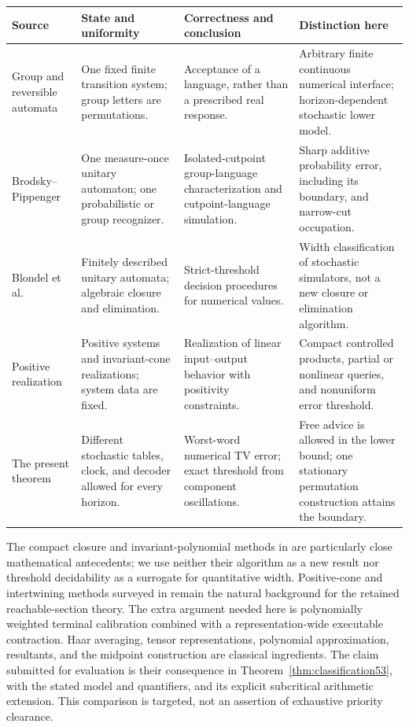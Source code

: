 \documentclass[11pt]{amsart}
\numberwithin{equation}{section}
\theoremstyle{definition}
\theoremstyle{remark}
\begin{document}
\begin{center}\footnotesize
\setlength{\tabcolsep}{3pt}
\begin{tabular}{p{}p{}p{}p{}}
\toprule
Source & State and uniformity & Correctness and conclusion & Distinction here\\
\midrule
Group and reversible automata \cite{BP,Paz} & One fixed finite transition system; group letters are permutations. & Acceptance of a language, rather than a prescribed real response. & Arbitrary finite continuous numerical interface; horizon-dependent stochastic lower model.\\[4pt]
Brodsky--Pippenger \cite{BP} & One measure-once unitary automaton; one probabilistic or group recognizer. & Isolated-cutpoint group-language characterization and cutpoint-language simulation. & Sharp additive probability error, including its boundary, and narrow-cut occupation.\\[4pt]
Blondel et al.\ \cite{BJKP} & Finitely described unitary automata; algebraic closure and elimination. & Strict-threshold decision procedures for numerical values. & Width classification of stochastic simulators, not a new closure or elimination algorithm.\\[4pt]
Positive realization \cite{BF04} & Positive systems and invariant-cone realizations; system data are fixed. & Realization of linear input--output behavior with positivity constraints. & Compact controlled products, partial or nonlinear queries, and nonuniform error threshold.\\[4pt]
The present theorem & Different stochastic tables, clock, and decoder allowed for every horizon. & Worst-word numerical TV error; exact threshold from component oscillations. & Free advice is allowed in the lower bound; one stationary permutation construction attains the boundary.\\
\bottomrule
\end{tabular}
\end{center}

The compact closure and invariant-polynomial methods in \cite{BJKP} are particularly close mathematical antecedents; we use neither their algorithm as a new result nor threshold decidability as a surrogate for quantitative width. Positive-cone and intertwining methods surveyed in \cite{BF04} remain the natural background for the retained reachable-section theory. The extra argument needed here is polynomially weighted terminal calibration combined with a representation-wide executable contraction. Haar averaging, tensor representations, polynomial approximation, resultants, and the midpoint construction are classical ingredients. The claim submitted for evaluation is their consequence in Theorem~\ref{thm:classification53}, with the stated model and quantifiers, and its explicit subcritical arithmetic extension. This comparison is targeted, not an assertion of exhaustive priority clearance.
\end{document}
